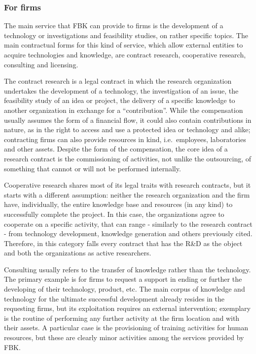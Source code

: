 \subsubsection{For firms}

The main service that FBK can provide to firms is the development of a technology or investigations and feasibility studies, on rather specific topics. The main contractual forms for this kind of service, which allow external entities to acquire technologies and knowledge, are contract research, cooperative research, consulting and licensing. 

The contract research is a legal contract in which the research organization undertakes the development of a technology, the investigation of an issue, the feasibility study of an idea or project, the delivery of a specific knowledge to another organization in exchange for a \enquote{contribution}. While the compensation usually assumes the form of a financial flow, it could also contain contributions in nature, as in the right to access and use a protected idea or technology and alike; contracting firms can also provide resources in kind, i.e.\ employees, laboratories and other assets. Despite the form of the compensation, the core idea of a research contract is the commissioning of activities, not unlike the outsourcing, of something that cannot or will not be performed internally.

Cooperative research shares most of its legal traits with research contracts, but it starts with a different assumption: neither the research organization and the firm have, individually, the entire knowledge base and resources (in any kind) to successfully complete the project. In this case, the organizations agree to cooperate on a specific activity, that can range - similarly to the research contract - from technology development, knowledge generation and others previously cited. Therefore, in this category falls every contract that has the R\&D as the object and both the organizations as active researchers.

Consulting usually refers to the transfer of knowledge rather than the technology. The primary example is for firms to request a support in ending or further the developing of their technology, product, etc. The main corpus of knowledge and technology for the ultimate successful development already resides in the requesting firms, but its exploitation requires an external intervention; exemplary is the routine of performing any further activity at the firm location and with their assets. A particular case is the provisioning of training activities for human resources, but these are clearly minor activities among the services provided by FBK.

